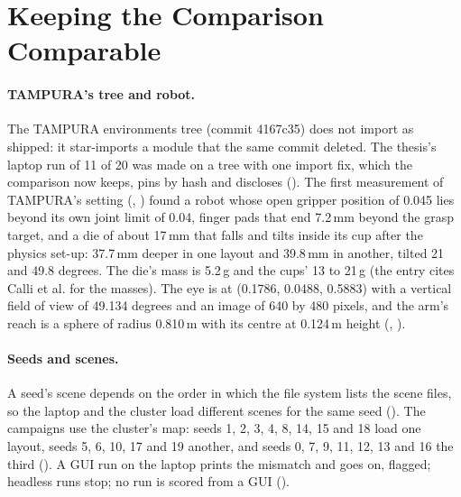 \section{Keeping the Comparison Comparable}
\label{sec:comparable}

\paragraph{TAMPURA's tree and robot.} The TAMPURA environments tree (commit
4167c35) does not import as shipped: it star-imports a module that the same commit
deleted. The thesis's laptop run of 11 of 20 was made on a tree with one import fix,
which the comparison now keeps, pins by hash and discloses (). The first measurement of TAMPURA's setting (, ) found a
robot whose open gripper position of 0.045 lies beyond its own joint limit of
0.04, finger pads that end 7.2\,mm beyond the grasp target, and a die of about
17\,mm that falls and tilts inside its cup after the physics set-up: 37.7\,mm
deeper in one layout and 39.8\,mm in another, tilted 21 and 49.8 degrees. The die's
mass is 5.2\,g and the cups' 13 to 21\,g (the entry cites Calli et al. for the
masses). The eye is at (0.1786, 0.0488, 0.5883) with a vertical field of view of
49.134 degrees and an image of 640 by 480 pixels, and the arm's reach is a sphere of
radius 0.810\,m with its centre at 0.124\,m height (, ).

\paragraph{Seeds and scenes.} A seed's scene depends on the order in which the file
system lists the scene files, so the laptop and the cluster load different scenes
for the same seed (). The campaigns use the cluster's map: seeds 1, 2, 3, 4, 8,
14, 15 and 18 load one layout, seeds 5, 6, 10, 17 and 19 another, and seeds 0, 7, 9,
11, 12, 13 and 16 the third (). A GUI run on the laptop prints the mismatch
and goes on, flagged; headless runs stop; no run is scored from a GUI ().

